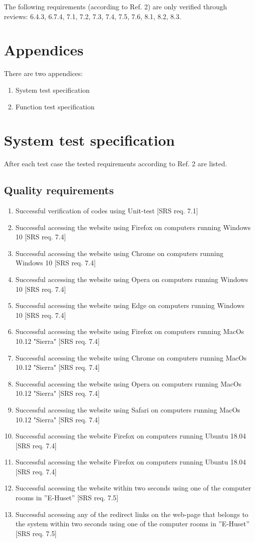 \documentclass{article}
\begin{document}
The following requirements (according to Ref. 2) are only verified through
reviews: 6.4.3, 6.7.4, 7.1, 7.2, 7.3, 7.4, 7.5, 7.6, 8.1, 8.2, 8.3.

\section{Appendices}
There are two appendices:
\begin{enumerate}[label=\Alph*]
    \item System test specification
    \item Function test specification
\end{enumerate}
\newpage
\appendix
\section{System test specification}
After each test case the tested requirements according to Ref. 2 are listed.

\subsection{Quality requirements}

\begin{enumerate}[start=1,label={ST1.\arabic* }, leftmargin = 1.1cm, nolistsep]
\item Successful verification of codes using Unit-test [SRS req. 7.1]
\item Successful accessing the website using Firefox on computers running Windows 10 [SRS req. 7.4]
\item Successful accessing the website using Chrome on computers running Windows 10 [SRS req. 7.4]
\item Successful accessing the website using Opera on computers running Windows 10 [SRS req. 7.4]
\item Successful accessing the website using Edge on computers running Windows 10 [SRS req. 7.4]
\item Successful accessing the website using Firefox on computers running  MacOs  10.12 "Sierra" [SRS req. 7.4]
\item Successful accessing the website using Chrome on computers running  MacOs  10.12 "Sierra" [SRS req. 7.4]
\item Successful accessing the website using Opera on computers running  MacOs  10.12 "Sierra" [SRS req. 7.4]
\item Successful accessing the website using Safari on computers running  MacOs  10.12 "Sierra" [SRS req. 7.4]
\item Successful accessing the website Firefox on computers  running Ubuntu 18.04 [SRS req. 7.4]
\item Successful accessing the website Firefox on computers  running Ubuntu 18.04 [SRS req. 7.4]
\item Successful accessing the website within two seconds using one of the  computer rooms in ”E-Huset” [SRS req. 7.5]
\item Successful accessing any of the redirect links on the web-page that belongs to the system within two seconds using one of the computer rooms in ”E-Huset” [SRS req. 7.5]
\end{enumerate}
\end{document}

